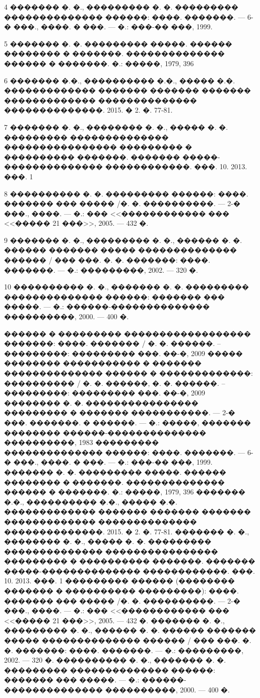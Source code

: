 \documentclass[a4paper]{article}
\begin{document}
4 ������� �. �., ��������� �. �. ��������� �������������� ������: ����. �������. --- 6-� ���., ����. � ���. --- �.: ���-�� ���, 1999.

5 ������� �. �. ��������� �����. ������ �������� � �������. �������������� ������ � �������. �.: �����, 1979, 396

6 ������� �.�., ���������� �.�., ����� �.�.
������������� ������� ������� ������� ������������� �������������� ��������������. 2015. � 2. �. 77-81.

7 ������� �. �., �������� �. �., ����� �. �. ��������� �������������� ���������������� ��������� � ���������� �������. ������� �����-�������������� ������������. ���. 10. 2013. ���. 1

8 ���������� �. �. ��������� ������: ����. ������� ��� ����� /�. �. ����������. --- 2-� ���., ����. --- �.: ��� <<������������ ��� <<����� 21 ���>>, 2005. --- 432 �.

9 ������� �. �., ��������� �. �., ������ �. �. ������ ������� ����� �������������� ������ / ��� ���. �. �. �������: ����. �������. --- �.: ���������, 2002. --- 320 �.

10 ���������� �. �., ������� �. �. ��������� �������������� ������: ������� ��� �����. --- �.: ������-�������������� ����������, 2000. --- 400 �.

\newpage
\begin{thebibliography}{15}
  ������ � ��������� ������������������ �������: ����. ������� / �. �. ������. -- ���������: ��������� ���. ��-�, 2009
  ����� �������� ����������� � ������� �������������� ������ � �������������: ���������� / �. �. ������, �. �. ������. -- ���������: ��������� ���. ��-�, 2009
  �������� �. �. ���������������� ��������� � ������� �����������. --- 2-� ���. �������. � ������. --- �.: �����, ������� �������� ������-�������������� ����������, 1983
  ��������� �������������� ������: ����. �������. --- 6-� ���., ����. � ���. --- �.: ���-�� ���, 1999.
  ������� �. �. ��������� �����. ������ �������� � �������. �������������� ������ � �������. �.: �����, 1979, 396
  ������� �.�., ���������� �.�., ����� �.�.
  ������������� ������� ������� ������� ������������� �������������� ��������������. 2015. � 2. �. 77-81.
  ������� �. �., �������� �. �., ����� �. �. ��������� �������������� ���������������� ��������� � ���������� �������. ������� �����-�������������� ������������. ���. 10. 2013. ���. 1
  ��������� ������ (�������� ������� � ���������� ���������): ����. ������� ��� ����� /�. �. ����������. --- 2-� ���., ����. --- �.: ��� <<������������ ��� <<����� 21 ���>>, 2005. --- 432 �.
  ������� �. �., ��������� �. �., ������ �. �. ������ ������� ����� �������������� ������ / ��� ���. �. �. �������: ����. �������. --- �.: ���������, 2002. --- 320 �.
  ���������� �. �., ������� �. �. ��������� �������������� ������: ������� ��� �����. --- �.: ������-�������������� ����������, 2000. --- 400 �.


\end{thebibliography}
\end{document}
